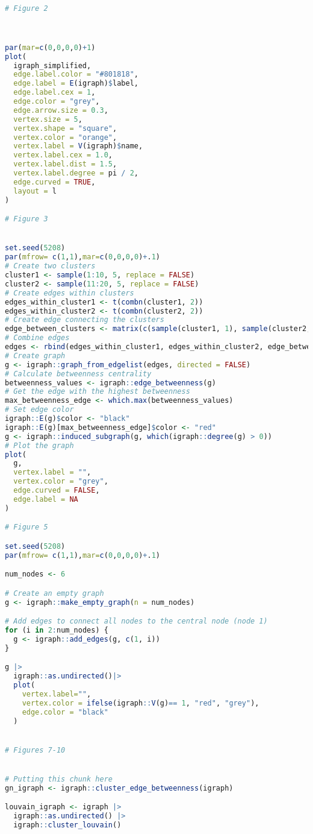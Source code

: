 \documentclass{article}
\begin{document}
\begin{lstlisting}[language=R]
# Figure 2



par(mar=c(0,0,0,0)+1)
plot(
  igraph_simplified,
  edge.label.color = "#801818",
  edge.label = E(igraph)$label,
  edge.label.cex = 1,
  edge.color = "grey",
  edge.arrow.size = 0.3,
  vertex.size = 5,
  vertex.shape = "square",
  vertex.color = "orange",
  vertex.label = V(igraph)$name,
  vertex.label.cex = 1.0,
  vertex.label.dist = 1.5,
  vertex.label.degree = pi / 2,
  edge.curved = TRUE,
  layout = l
)

# Figure 3


set.seed(5208)
par(mfrow= c(1,1),mar=c(0,0,0,0)+.1)
# Create two clusters
cluster1 <- sample(1:10, 5, replace = FALSE)
cluster2 <- sample(11:20, 5, replace = FALSE)
# Create edges within clusters
edges_within_cluster1 <- t(combn(cluster1, 2))
edges_within_cluster2 <- t(combn(cluster2, 2))
# Create edge connecting the clusters
edge_between_clusters <- matrix(c(sample(cluster1, 1), sample(cluster2, 1)), ncol = 2)
# Combine edges
edges <- rbind(edges_within_cluster1, edges_within_cluster2, edge_between_clusters)
# Create graph
g <- igraph::graph_from_edgelist(edges, directed = FALSE)
# Calculate betweenness centrality
betweenness_values <- igraph::edge_betweenness(g)
# Get the edge with the highest betweenness
max_betweenness_edge <- which.max(betweenness_values)
# Set edge color
igraph::E(g)$color <- "black"
igraph::E(g)[max_betweenness_edge]$color <- "red"
g <- igraph::induced_subgraph(g, which(igraph::degree(g) > 0))
# Plot the graph
plot(
  g,
  vertex.label = "",
  vertex.color = "grey",
  edge.curved = FALSE,
  edge.label = NA
)

# Figure 5

set.seed(5208)
par(mfrow= c(1,1),mar=c(0,0,0,0)+.1)

num_nodes <- 6

# Create an empty graph
g <- igraph::make_empty_graph(n = num_nodes)

# Add edges to connect all nodes to the central node (node 1)
for (i in 2:num_nodes) {
  g <- igraph::add_edges(g, c(1, i)) 
}

g |>
  igraph::as.undirected()|>
  plot(
    vertex.label="",
    vertex.color = ifelse(igraph::V(g)== 1, "red", "grey"),
    edge.color = "black"
  )


# Figures 7-10


# Putting this chunk here
gn_igraph <- igraph::cluster_edge_betweenness(igraph)

louvain_igraph <- igraph |>
  igraph::as.undirected() |> 
  igraph::cluster_louvain()


\end{lstlisting}
\end{document}
